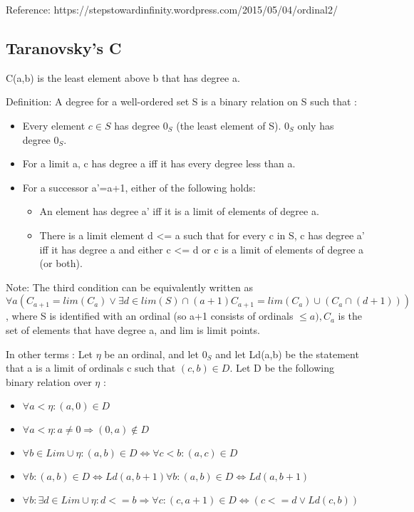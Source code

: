 \documentclass[10pt]{article}
\begin{document}
Reference: https://stepstowardinfinity.wordpress.com/2015/05/04/ordinal2/  

\subsection{Taranovsky's C}


C(a,b) is the least element above b that has degree a.

Definition: A degree for a well-ordered set S is a binary relation on S such that :

\begin{itemize}
	\item Every element \( c \in S \) has degree \( 0_S \) (the least element of S). \( 0_S \) only has degree \( 0_S \).
	\item For a limit a, c has degree a iff it has every degree less than a.
	\item For a successor a'=a+1, either of the following holds:
	\begin{itemize}
		\item An element has degree a' iff it is a limit of elements of degree a.
		\item There is a limit element d <= a such that for every c in S, c has degree a' iff it has degree a and either c <= d or c is a limit of elements of degree a (or both).
	\end{itemize}
\end{itemize}

Note: The third condition can be equivalently written as \( \forall a (C_{a+1} = lim(C_a) \vee \exists d \in lim(S) \cap (a+1) C_{a+1} = lim(C_a) \cup (C_a \cap (d+1))) \), where S is identified with an ordinal (so a+1 consists of ordinals \( \leq a), C_a \) is the set of elements that have degree a, and lim is limit points.

In other terms : Let \( \eta \) be an ordinal, and let \( 0_S \) and let Ld(a,b) be the statement that a is a limit of ordinals c such that \( (c,b) \in D \). Let D be the following binary relation over \( \eta \) :

\begin{itemize}
	\item \( \forall a<\eta:(a,0) \in D \)
	\item \( \forall a<\eta:a \neq 0 \Rightarrow (0,a) \notin D \)
	\item \( \forall b\in Lim \cup \eta:(a,b)\in D \Leftrightarrow \forall c<b:(a,c)\in D \)
	\item \( \forall b:(a,b)\in D \Leftrightarrow Ld(a,b+1)\forall b:(a,b)\in D \Leftrightarrow Ld(a,b+1) \)
	\item \( \forall b:\exists d\in Lim \cup  \eta :d<=b \Rightarrow \forall c:(c,a+1)\in D \Leftrightarrow (c<=d \vee Ld(c,b)) \)
\end{itemize}
\end{document}
